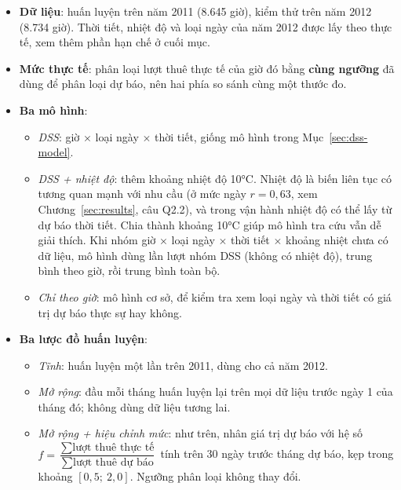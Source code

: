 \begin{itemize}
    \item \textbf{Dữ liệu}: huấn luyện trên năm 2011 (8.645 giờ), kiểm thử trên năm 2012 (8.734 giờ). Thời tiết, nhiệt độ và loại ngày của năm 2012 được lấy theo thực tế, xem thêm phần hạn chế ở cuối mục.
    \item \textbf{Mức thực tế}: phân loại lượt thuê thực tế của giờ đó bằng \textbf{cùng ngưỡng} đã dùng để phân loại dự báo, nên hai phía so sánh cùng một thước đo.
    \item \textbf{Ba mô hình}:
    \begin{itemize}
        \item \textit{DSS}: giờ $\times$ loại ngày $\times$ thời tiết, giống mô hình trong Mục~\ref{sec:dss-model}.
        \item \textit{DSS + nhiệt độ}: thêm khoảng nhiệt độ 10°C. Nhiệt độ là biến liên tục có tương quan mạnh với nhu cầu (ở mức ngày $r = 0{,}63$, xem Chương~\ref{sec:results}, câu Q2.2), và trong vận hành nhiệt độ có thể lấy từ dự báo thời tiết. Chia thành khoảng 10°C giúp mô hình tra cứu vẫn dễ giải thích. Khi nhóm giờ $\times$ loại ngày $\times$ thời tiết $\times$ khoảng nhiệt chưa có dữ liệu, mô hình dùng lần lượt nhóm DSS (không có nhiệt độ), trung bình theo giờ, rồi trung bình toàn bộ.
        \item \textit{Chỉ theo giờ}: mô hình cơ sở, để kiểm tra xem loại ngày và thời tiết có giá trị dự báo thực sự hay không.
    \end{itemize}
    \item \textbf{Ba lược đồ huấn luyện}:
    \begin{itemize}
        \item \textit{Tĩnh}: huấn luyện một lần trên 2011, dùng cho cả năm 2012.
        \item \textit{Mở rộng}: đầu mỗi tháng huấn luyện lại trên mọi dữ liệu trước ngày 1 của tháng đó; không dùng dữ liệu tương lai.
        \item \textit{Mở rộng + hiệu chỉnh mức}: như trên, nhân giá trị dự báo với hệ số $f = \dfrac{\sum \text{lượt thuê thực tế}}{\sum \text{lượt thuê dự báo}}$ tính trên 30 ngày trước tháng dự báo, kẹp trong khoảng $[0{,}5;\ 2{,}0]$. Ngưỡng phân loại không thay đổi.
    \end{itemize}
\end{itemize}

